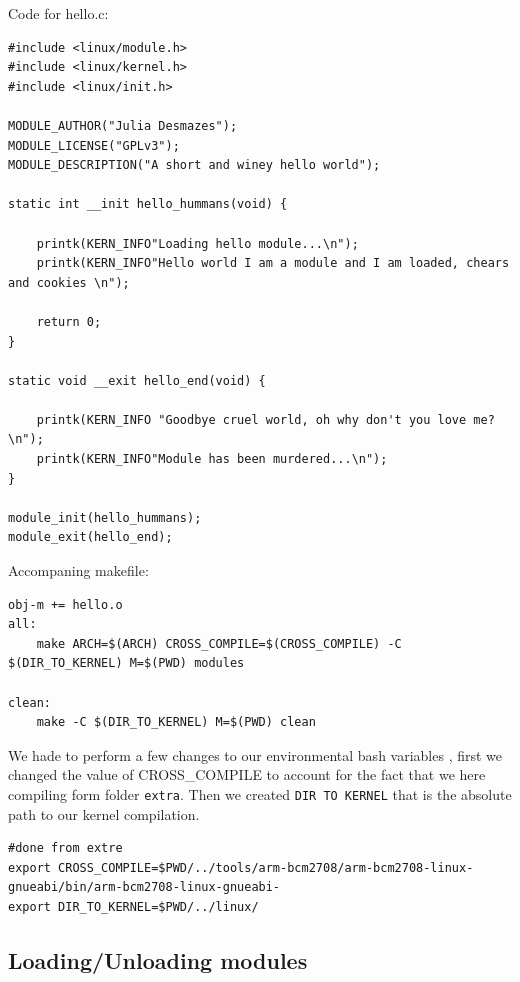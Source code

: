 \documentclass[a4paper,oneside,onecolumn]{article}
\newcommand{\code}[1]{\colorbox{codegray}{\texttt{#1}}}
\begin{document}
Code for hello.c:
\begin{lstlisting}
#include <linux/module.h>       
#include <linux/kernel.h>  
#include <linux/init.h>   

MODULE_AUTHOR("Julia Desmazes");
MODULE_LICENSE("GPLv3");
MODULE_DESCRIPTION("A short and winey hello world");

static int __init hello_hummans(void) {

	printk(KERN_INFO"Loading hello module...\n");
	printk(KERN_INFO"Hello world I am a module and I am loaded, chears and cookies \n");

	return 0;
}

static void __exit hello_end(void) {

	printk(KERN_INFO "Goodbye cruel world, oh why don't you love me?\n");
	printk(KERN_INFO"Module has been murdered...\n");
}

module_init(hello_hummans);
module_exit(hello_end);
\end{lstlisting}
Accompaning makefile:
\begin{lstlisting}
obj-m += hello.o
all:
	make ARCH=$(ARCH) CROSS_COMPILE=$(CROSS_COMPILE) -C $(DIR_TO_KERNEL) M=$(PWD) modules

clean:
	make -C $(DIR_TO_KERNEL) M=$(PWD) clean
\end{lstlisting}
We hade to perform a few changes to our environmental bash variables , first we changed the value of CROSS\_COMPILE to account for the fact that we here compiling form folder \texttt{extra}. Then we created \code{DIR TO KERNEL} that is the absolute path to our kernel compilation.
\begin{lstlisting}
#done from extre
export CROSS_COMPILE=$PWD/../tools/arm-bcm2708/arm-bcm2708-linux-gnueabi/bin/arm-bcm2708-linux-gnueabi-
export DIR_TO_KERNEL=$PWD/../linux/
\end{lstlisting}

\subsection{Loading/Unloading modules}
\end{document}
